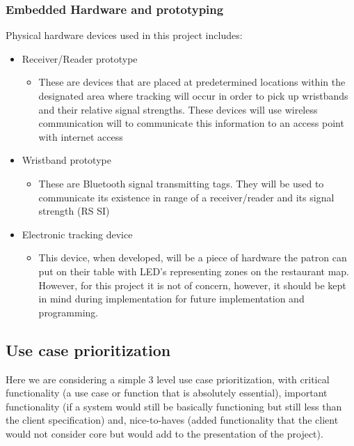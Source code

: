 \documentclass[11pt,titlepage]{article} %
\begin{document}
	\subsubsection{Embedded Hardware and prototyping}
Physical hardware devices used in this project includes:
\begin{itemize}
\item Receiver/Reader prototype
	\begin{itemize}
	\item These  are  devices  that  are  placed  at  predetermined  locations  within  the 
		designated area where tracking will occur in order to pick up wristbands and their relative signal strengths.  				These devices will use wireless communication will to communicate this information to an access point with 					internet access
	\end{itemize}	
\item Wristband prototype
	\begin{itemize}
		\item These  are Bluetooth signal transmitting tags. They will be used to communicate its existence in range of a receiver/reader 				and its signal strength (RS SI)
	\end{itemize}
	
\item Electronic tracking device	
\begin{itemize}
\item This device, when developed, will be a piece of hardware the patron can put on their table with LED’s representing zones on the restaurant map. However, for this project it is not of concern, however, it should be kept in mind during implementation for future implementation and programming.
\end{itemize}	
\end{itemize}
	
\subsection{Use case prioritization}
	Here we are considering a simple 3 level use case prioritization, with critical functionality (a use case or function that is absolutely essential), important functionality (if a system would still be basically functioning but still less than the client specification) and, nice-to-haves (added functionality that the client would not consider core but would add to the presentation of the project).
	
\end{document}
